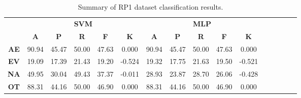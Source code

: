 \begin{landscape}
\begin{table}[htbp]
\footnotesize
\centering
\caption{Summary of RP1 dataset classification results.}
\label{tab:base_female}
\begin{tabular}{|c|c|c|c|c|c|c|c|c|c|c|c|c|c|c|c|}
\hline
\multirow{2}{*}{}	& \multicolumn{5}{c|}{\textbf{SVM}}												& \multicolumn{5}{c|}{\textbf{MLP}}												\\ \cline{2-11} 
					& \textbf{A}	& \textbf{P}	& \textbf{R}	& \textbf{F}	& \textbf{K}	& \textbf{A}	& \textbf{P}	& \textbf{R}	& \textbf{F}	& \textbf{K}	\\ \hline
\textbf{AE}			& 90.94			& 45.47			& 50.00			& 47.63			& 0.000			& 90.94			& 45.47			& 50.00			& 47.63			& 0.000			\\ \hline
\textbf{EV}			& 19.09			& 17.39			& 21.43			& 19.20			& -0.524			& 19.32			& 17.75			& 21.63			& 19.50			& -0.521			\\ \hline
\textbf{NA}			& 49.95			& 30.04			& 49.43			& 37.37			& -0.011			& 28.93			& 23.87			& 28.70			& 26.06			& -0.428			\\ \hline
\textbf{OT}			& 88.31			& 44.16			& 50.00			& 46.90			& 0.000			& 88.31			& 44.16			& 50.00			& 46.90			& 0.000			\\ \hline
\end{tabular}
\end{table}
\end{landscape}